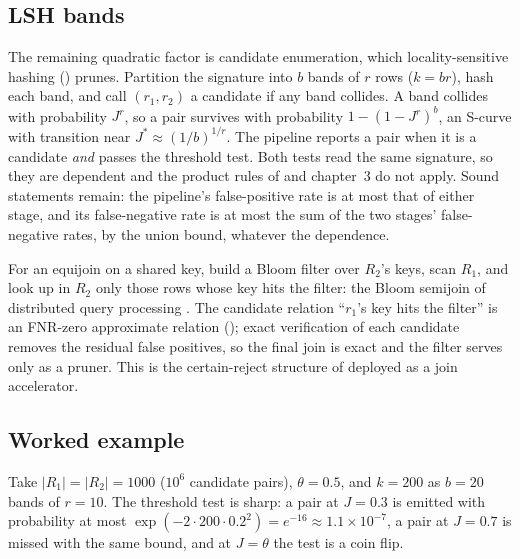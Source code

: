 \subsection*{LSH bands}

The remaining quadratic factor is candidate enumeration, which
locality-sensitive hashing
() prunes. Partition the signature into $b$ bands of $r$
rows ($k = br$), hash each band, and call $(r_1, r_2)$ a candidate if any band
collides. A band collides with probability $J^r$, so a pair survives with
probability $1 - (1 - J^r)^b$, an S-curve with transition near $J^* \approx
(1/b)^{1/r}$. The pipeline reports a pair when it is a candidate \emph{and} passes
the threshold test. Both tests read the same signature, so they are dependent and
the product rules of  and chapter~3 do not apply. Sound
statements remain: the pipeline's false-positive rate is at most that of either
stage, and its false-negative rate is at most the sum of the two stages'
false-negative rates, by the union bound, whatever the dependence.

\begin{remark}
\label{rem:bloom-equijoin}
For an equijoin on a shared key, build a Bloom filter over $R_2$'s keys, scan
$R_1$, and look up in $R_2$ only those rows whose key hits the filter: the Bloom
semijoin of distributed query processing \parencite{mullin-1990}.
The candidate relation ``$r_1$'s key hits the filter'' is an FNR-zero approximate
relation (); exact verification of each candidate removes
the residual false positives, so the final join is exact and the filter serves
only as a pruner. This is the certain-reject structure of
 deployed as a join accelerator.
\end{remark}

\subsection*{Worked example}

Take $|R_1| = |R_2| = 1000$ ($10^6$ candidate pairs), $\theta = 0.5$, and $k = 200$
as $b = 20$ bands of $r = 10$. The threshold test is sharp: a pair at $J = 0.3$ is
emitted with probability at most $\exp(-2 \cdot 200 \cdot 0.2^2) = e^{-16} \approx
1.1 \times 10^{-7}$, a pair at $J = 0.7$ is missed with the same bound, and at $J =
\theta$ the test is a coin flip.

